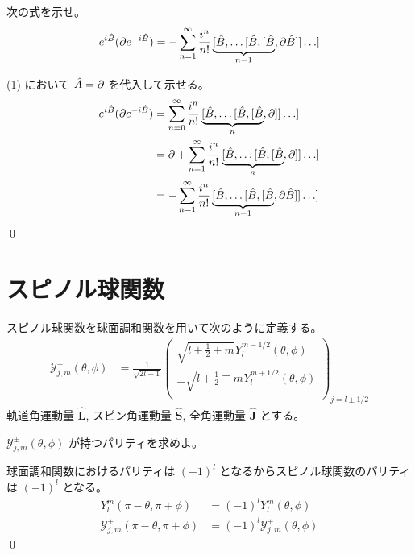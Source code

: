 \documentclass[uplatex,dvipdfmx,a4paper,11pt]{jlreq}
\makeatletter
\numberwithin{equation}{section}
\theoremstyle{definition}
\renewenvironment{proof}[1][\proofname]{\par
  \normalfont
  \topsep6\p@\@plus6\p@ \trivlist
  \item[\hskip\labelsep{\bfseries #1}\@addpunct{\bfseries}]\ignorespaces\quad\par
}{%
  \qed\endtrivlist\@endpefalse
}
\renewcommand\proofname{証明}
\makeatother
\begin{document}
\begin{problem}
次の式を示せ。
\begin{align}
  e^{i\BB}(\partial e^{-i\BB}) = -\sum_{n=1}^{\infty}\frac{i^n}{n!}\underbrace{[\BB, \ldots [\BB, [\BB}_{n-1}, \partial\BB]] \ldots]
\end{align}
\end{problem}
\begin{proof}
  (1) において $\AA = \partial$ を代入して示せる。
  \begin{align}
    e^{i\BB}(\partial e^{-i\BB}) & = \sum_{n=0}^{\infty}\frac{i^n}{n!}\underbrace{[\BB, \ldots [\BB, [\BB}_{n}, \partial]] \ldots]            \\
                                 & = \partial + \sum_{n=1}^{\infty}\frac{i^n}{n!}\underbrace{[\BB, \ldots [\BB, [\BB}_{n}, \partial]] \ldots] \\
                                 & = -\sum_{n=1}^{\infty}\frac{i^n}{n!}\underbrace{[\BB, \ldots [\BB, [\BB}_{n-1}, \partial\BB]] \ldots]      \\
  \end{align}
\end{proof}

\section{スピノル球関数}
\begin{problem}
スピノル球関数を球面調和関数を用いて次のように定義する。
\begin{align}
  \mathcal{Y}_{j, m}^\pm(\theta, \phi) & = \frac{1}{\sqrt{2l + 1}}\begin{pmatrix}
                                                                    \sqrt{l + \frac{1}{2} \pm m}Y_l^{m - 1/2}(\theta, \phi)    \\
                                                                    \pm\sqrt{l + \frac{1}{2} \mp m}Y_l^{m + 1/2}(\theta, \phi) \\
                                                                  \end{pmatrix}_{j = l\pm 1/2}
\end{align}
軌道角運動量 $\hat{\bm{L}}$, スピン角運動量 $\hat{\bm{S}}$, 全角運動量 $\hat{\bm{J}}$ とする。

$\mathcal{Y}_{j, m}^\pm(\theta, \phi)$ が持つパリティを求めよ。
\end{problem}
\begin{proof}
  球面調和関数におけるパリティは $(-1)^l$ となるからスピノル球関数のパリティは $(-1)^l$ となる。
  \begin{align}
    Y_l^m(\pi - \theta, \pi + \phi)                  & = (-1)^lY_l^m(\theta, \phi)                  \\
    \mathcal{Y}_{j, m}^\pm(\pi - \theta, \pi + \phi) & = (-1)^l\mathcal{Y}_{j, m}^\pm(\theta, \phi)
  \end{align}
\end{proof}
\end{document}
